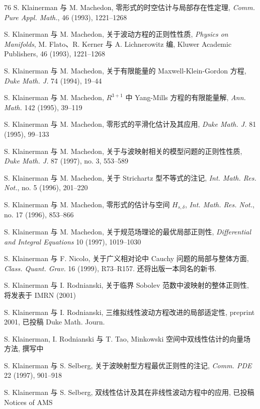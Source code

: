 \begin{mybibliography}{76}
 S. Klainerman 与 M. Machedon,  零形式的时空估计与局部存在性定理,  \emph{Comm. Pure Appl. Math.},  46 (1993),  1221--1268

 S. Klainerman 与 M. Machedon,  关于波动方程的正则性性质,  \emph{Physics on Manifolds},  M. Flato、R. Kerner 与 A. Lichnerowitz 编,  Kluwer Academic Publishers,  46 (1993),  1221--1268

 S. Klainerman 与 M. Machedon,  关于有限能量的 Maxwell-Klein-Gordon 方程,  \emph{Duke Math. J.} 74 (1994),  19--44

 S. Klainerman 与 M. Machedon,  $R^{3+1}$ 中 Yang-Mills 方程的有限能量解,  \emph{Ann. Math.} 142 (1995),  39--119

 S. Klainerman 与 M. Machedon,  零形式的平滑化估计及其应用,  \emph{Duke Math. J.} 81 (1995),  99--133

 S. Klainerman 与 M. Machedon,  关于与波映射相关的模型问题的正则性性质,  \emph{Duke Math. J.} 87 (1997),  no. 3,  553--589

 S. Klainerman 与 M. Machedon,  关于 Strichartz 型不等式的注记,  \emph{Int. Math. Res. Not.},  no. 5 (1996),  201--220

 S. Klainerman 与 M. Machedon,  零形式的估计与空间 $H_{s, \delta}$,  \emph{Int. Math. Res. Not.},  no. 17 (1996),  853--866

 S. Klainerman 与 M. Machedon,  关于规范场理论的最优局部正则性,  \emph{Differential and Integral Equations} 10 (1997),  1019--1030

 S. Klainerman 与 F. Nicolo,  关于广义相对论中 Cauchy 问题的局部与整体方面,  \emph{Class. Quant. Grav.} 16 (1999),  R73--R157. 还将出版一本同名的新书. 

 S. Klainerman 与 I. Rodnianski,  关于临界 Sobolev 范数中波映射的整体正则性,  将发表于 IMRN (2001)

 S. Klainerman 与 I. Rodnianski,  三维拟线性波动方程改进的局部适定性,  preprint 2001,  已投稿 Duke Math. Journ.

 S. Klainerman,  I. Rodnianski 与 T. Tao,  Minkowski 空间中双线性估计的向量场方法,  撰写中

 S. Klainerman 与 S. Selberg,  关于波映射型方程最优正则性的注记,  \emph{Comm. PDE} 22 (1997),  901--918

 S. Klainerman 与 S. Selberg,  双线性估计及其在非线性波动方程中的应用,  已投稿 Notices of AMS


\end{mybibliography}
